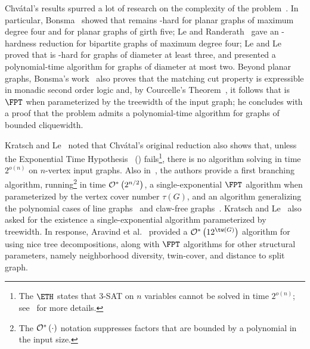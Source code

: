 Chvátal's results spurred a lot of research on the complexity of the problem~\cite{matching_cut_ipec,matching_cut_structural,matching_cut_tcs, matching_cut_diameter, matching_cut_planar, matching_cut_series_parallel, stable_cutset_line_graphs}.
In particular, Bonsma~\cite{matching_cut_planar} showed that  remains \NP-hard for planar graphs of maximum degree four and for planar graphs of girth five;
Le and Randerath~\cite{stable_cutset_line_graphs} gave an \NP-hardness reduction for bipartite graphs of maximum degree four;
Le and Le~\cite{matching_cut_diameter} proved that  is \NP-hard for graphs of diameter at least three, and presented a polynomial-time algorithm for graphs of diameter at most two.
Beyond planar graphs, Bonsma's work~\cite{matching_cut_planar} also proves that the matching cut property is expressible in monadic second order logic and, by Courcelle's Theorem~\cite{courcelle_theorem}, it follows that  is $\FPT$ when parameterized by the treewidth of the input graph; he concludes with a proof that the problem admits a polynomial-time algorithm for graphs of bounded cliquewidth.

Kratsch and Le~\cite{matching_cut_tcs} noted that Chv\'atal's original reduction also shows that, unless the Exponential Time Hypothesis~\cite{eth} (\ETH) fails\footnote{The $\ETH$ states that 3-\textsc{SAT} on $n$ variables cannot be solved in time $2^{o(n)}$; see~\cite{eth} for more details.}, there is no algorithm solving  in time $2^{o(n)}$ on $n$-vertex input graphs.
Also in~\cite{matching_cut_tcs}, the authors provide a first branching algorithm, running\footnote{The $\mathcal{O}^*\left(\cdot\right)$ notation suppresses factors that are bounded by a polynomial in the input size.} in time $\mathcal{O}^*\left(2^{n/2}\right)$, a single-exponential $\FPT$ algorithm when parameterized by the vertex cover number $\tau(G)$, and an algorithm generalizing the polynomial cases of line graphs~\cite{matching_cut_moshi} and claw-free graphs~\cite{matching_cut_planar}.
Kratsch and Le~\cite{matching_cut_tcs} also asked for the existence a single-exponential algorithm parameterized by treewidth.
In response, Aravind et al.~\cite{matching_cut_structural} provided a $\bigOs{12^{\tw(G)}}$ algorithm for  using nice tree decompositions, along with $\FPT$ algorithms for other structural parameters, namely neighborhood diversity, twin-cover, and distance to split graph.

